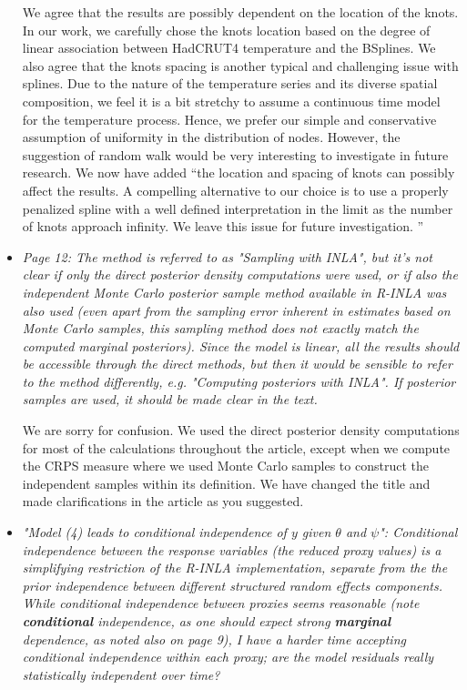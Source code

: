\documentclass[11pt]{article}
\begin{document}
\begin{itemize}
We agree that the results are possibly dependent on the location of the knots. 
In our work, we carefully chose the knots location based on the degree of linear association between HadCRUT4 temperature and the BSplines. 
We also agree that the knots spacing is another typical and challenging issue with splines. Due to the
nature of the temperature series and its diverse spatial composition, we feel it is a bit stretchy to assume a continuous time model for the temperature process.  Hence, we prefer our simple and conservative assumption of uniformity in the distribution of nodes. However, the suggestion of random walk would be very interesting to investigate in future research. We now have added ``the location and spacing of knots can possibly affect the results.  A compelling alternative to our choice is to use a properly penalized spline with a well
defined interpretation in the limit as the number of knots approach infinity. We leave this issue for future investigation. ''



\item \textit{Page 12: The method is referred to as "Sampling with INLA", but it's
  not clear if only the direct posterior density computations were
  used, or if also the independent Monte Carlo posterior sample method
  available in R-INLA was also used (even apart from the sampling
  error inherent in estimates based on Monte Carlo samples, this
  sampling method does not exactly match the computed marginal
  posteriors).  Since the model is linear, all the results should be
  accessible through the direct methods, but then it would be sensible
  to refer to the method differently, e.g. "Computing posteriors with
  INLA". If posterior samples are used, it should be made clear in the
  text.} 

We are sorry for confusion. We used the direct posterior density computations
for most of the calculations throughout the article, except when we compute the
CRPS measure where we used Monte Carlo samples to construct the independent
samples within its definition. We have changed the title and made clarifications in the article as you suggested.

\item \textit{"Model (4) leads to conditional independence of $y$ given $\theta$ and
  $\psi$": Conditional independence between the response variables (the
  reduced proxy values) is a simplifying restriction of the R-INLA
  implementation, separate from the the prior independence between
  different structured random effects components. While conditional
  independence between proxies seems reasonable (note \textbf{conditional}
  independence, as one should expect strong \textbf{marginal} dependence, as
  noted also on page 9), I have a harder time accepting conditional
  independence within each proxy; are the model residuals really
  statistically independent over time?}


\end{itemize}
\end{document}
